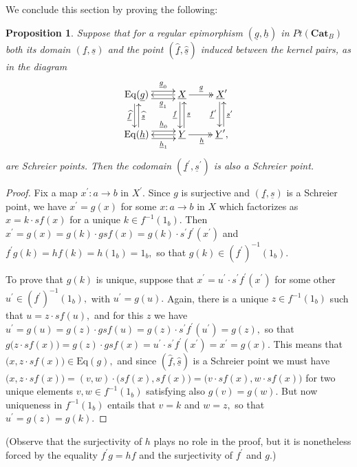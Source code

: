 \documentclass[11pt]{amsart}
\theoremstyle{plain}
\newtheorem{proposition}[subsubsection]{Proposition}
\theoremstyle{definition}
\theoremstyle{remark}
\begin{document}
We conclude this section by proving the following:
\begin{proposition}
Suppose that for a regular epimorphism $(\underline{g},\underline{h})$ in $Pt(\mathbf{Cat}_B)$ both its domain $(\underline{f},\underline{s})$ and the point $(\underline{\widehat{f}},\underline{\widehat{s}})$ induced between the kernel pairs, as in the diagram
\begin{equation}
\begin{aligned}
\label{eqn:sch-2-regular}
\xymatrix{
{\mathrm{Eq}(\underline{g})} \ar@<.9ex>[r]^-{\underline{g}_0} \ar@<-.9ex>[r]_-{\underline{g}_1} \ar@<-.5ex>[d]_-{\underline{\widehat{f}}}  &{\underline{X}} \ar[l] \ar@{->>}[r]^-{\underline{g}} \ar@<-.5ex>[d]_-{\underline{f}} &{\underline{X}^\prime} \ar@<-.5ex>[d]_-{{\underline{f}}^\prime} \\
{\mathrm{Eq}(\underline{h})} \ar@<.9ex>[r]^-{\underline{h}_0} \ar@<-.9ex>[r]_-{\underline{h}_1} \ar@<-.5ex>[u]_-{\underline{\widehat{s}}}  &{\underline{Y}} \ar[l] \ar@{->>}[r]_{\underline{h}} \ar@<-.5ex>[u]_-{\underline{s}} &{\underline{Y}^\prime,} \ar@<-.5ex>[u]_-{{\underline{s}}^\prime}
}
\end{aligned}
\end{equation}
are Schreier points. Then the codomain $(\underline{f}^\prime,\underline{s}^\prime)$ is also a Schreier point.
\end{proposition}
\begin{proof}
Fix a map $x^\prime\colon a\rightarrow b$ in $X^\prime.$ Since $g$ is surjective and $(\underline{f},\underline{s})$ is a Schreier point, we have $x^\prime=g(x)$ for some $x\colon a\rightarrow b$ in $X$ which factorizes as $x=k\cdot sf(x)$ for a unique $k\in f^{-1}(1_b).$ Then $x^\prime=g(x)=g(k)\cdot gsf(x)=g(k)\cdot s^\prime f^\prime(x^\prime)$ and $f^\prime g(k)=hf(k)=h(1_b)=1_b,$ so that $g(k)\in (f^\prime)^{-1}(1_b).$

To prove that $g(k)$ is unique, suppose that $x^\prime=u^\prime\cdot s^\prime f^\prime(x^\prime)$ for some other $u^\prime\in(f^\prime)^{-1}(1_b),$ with $u^\prime=g(u).$ Again, there is a unique $z\in f^{-1}(1_b)$ such that $u=z\cdot sf(u),$ and for this $z$ we have $u^\prime=g(u)=g(z)\cdot gsf(u)=g(z)\cdot s^\prime f^\prime(u^\prime)=g(z),$ so that $g\big(z\cdot sf(x)\big)=g(z)\cdot gsf(x)=u^\prime\cdot s^\prime f^\prime(x^\prime)=x^\prime=g(x).$ This means that $\big(x,z\cdot sf(x)\big)\in\mathrm{Eq}(g),$ and since $(\underline{\widehat{f}},\underline{\widehat{s}})$ is a Schreier point we must have $\big(x,z\cdot sf(x)\big)=(v,w)\cdot\big(sf(x),sf(x)\big)=\big(v\cdot sf(x),w\cdot sf(x)\big)$ for two unique elements $v,w\in f^{-1}(1_b)$ satisfying also $g(v)=g(w).$ But now uniqueness in $f^{-1}(1_b)$ entails that $v=k$ and $w=z,$ so that $u^\prime=g(z)=g(k).$
\end{proof}
(Observe that the surjectivity of $h$ plays no role in the proof, but it is nonetheless forced by the equality $f^\prime g=hf$ and the surjectivity of $f^\prime$ and $g.$)
\end{document}
